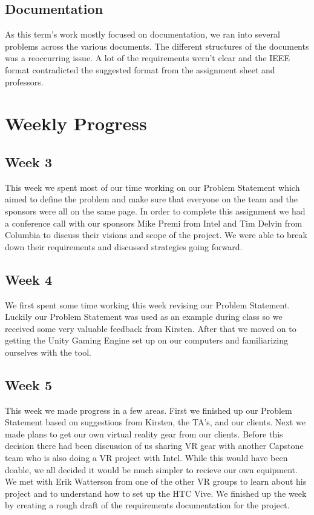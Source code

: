 \documentclass[10pt,journal,compsoc,onecolumn, draftclsnofoot]{IEEEtran}
\begin{document}
\subsection{Documentation}
As this term's work mostly focused on documentation, we ran into several problems across the various documents.
The different structures of the documents was a reoccurring issue.
A lot of the requirements wern't clear and the IEEE format contradicted the suggested format from the assignment sheet and professors.


\section{Weekly Progress}
\subsection{Week 3}
This week we spent most of our time working on our Problem Statement which aimed to define the problem and make sure that everyone on the team and the sponsors were all on the same page.
In order to complete this assignment we had a conference call with our sponsors Mike Premi from Intel and Tim Delvin from Columbia to discuss their visions and scope of the project.
We were able to break down their requirements and discussed strategies going forward.

\subsection{Week 4}
We first spent some time working this week revising our Problem Statement.
Luckily our Problem Statement was used as an example during class so we received some very valuable feedback from Kirsten.
After that we moved on to getting the Unity Gaming Engine set up on our computers and familiarizing ourselves with the tool.

\subsection{Week 5}
This week we made progress in a few areas.
First we finished up our Problem Statement based on suggestions from Kirsten, the TA's, and our clients.
Next we made plans to get our own virtual reality gear from our clients.
Before this decision there had been discussion of us sharing VR gear with another Capstone team who is also doing a VR project with Intel.
While this would have been doable, we all decided it would be much simpler to recieve our own equipment.
We met with Erik Watterson from one of the other VR groups to learn about his project and to understand how to set up the HTC Vive.
We finished up the week by creating a rough draft of the requirements documentation for the project.
\end{document}
